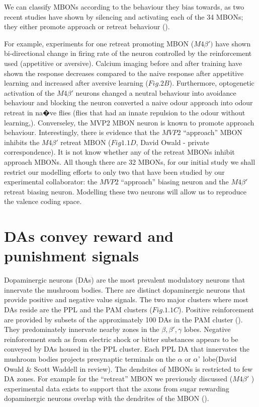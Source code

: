 We can classify MBONs according to the behaviour they bias towards,
as two recent studies have shown by silencing and activating each
of the 34 MBONs; they either promote approach or retreat behaviour
(\citealp{Aso:2014bh,Owald:2015cn}).

For example, experiments for one retreat promoting MBON ($M4\beta')$
have shown bi-directional change in firing rate of the neuron controlled
by the reinforcement used (appetitive or aversive). Calcium imaging
before and after training have shown the response decreases compared
to the naive response after appetitive learning and increased after
aversive learning ($Fig.2B$). Furthermore, optogenetic activation
of the $M4\beta'$ neurons changed a neutral behaviour into avoidance
behaviour and blocking the neuron converted a naive odour approach
into odour retreat in na�ve flies (flies that had an innate repulsion
to the odour without learning,\citealp{Owald:2015cn}). Converseley,
the MVP2 MBON neuron is known to promote approach behaviour. Interestingly,
there is evidence that the $MVP2$ ``approach'' MBON inhibits the
$M4\beta'$ retreat MBON ($Fig1.1D$, David Owald - private correspondence).
It is not know whether any of the retreat MBONs inhibit approach MBONs.
All though there are 32 MBONs, for our initial study we shall restrict
our modelling efforts to only two that have been studied by our experimental
collaborator: the $MVP2$ ``approach'' biasing neuron and the $M4\beta'$
retreat biasing neuron. Modelling these two neurons will allow us
to reproduce the valence coding space.


\section{DAs convey reward and punishment signals}

Dopaminergic neurons (DAs) are the most prevalent modulatory neurons
that innervate the mushroom bodies. There are distinct dopaminergic
neurons that provide positive and negative value signals. The two
major clusters where most DAs reside are the PPL and the PAM clusters
($Fig.1.1C$). Positive reinforcement are provided by subsets of the
approximately 100 DAs in the PAM cluster (\citealp{Burke:2012jt}).
They predominately innervate nearby zones in the $\beta,\beta',\gamma$
lobes. Negative reinforcement such as from electric shock or bitter
substances appears to be conveyed by DAs housed in the PPL cluster.
Each PPL DA that innervates the mushroom bodies projects presynaptic
terminals on the $\alpha$ or $\alpha\lyxmathsym{\textquoteright}$
lobe(David Owald \& Scott Waddell \textendash{} in review). The dendrites
of MBONs is restricted to few DA zones. For example for the ``retreat''
MBON we previously discussed ($M4\beta'$ ) experimental data exists
to support that the axons from sugar rewarding dopaminergic neurons
overlap with the dendrites of the MBON (\citealp{Owald:2015cn}).



